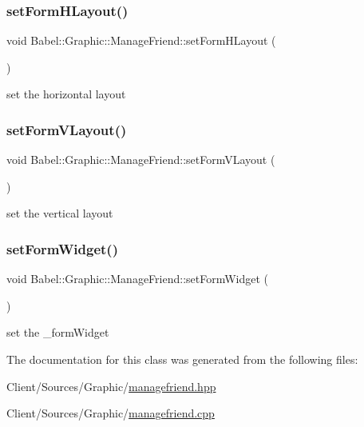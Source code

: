 \subsubsection{\texorpdfstring{set\+Form\+H\+Layout()}{setFormHLayout()}}
{\footnotesize\ttfamily void Babel\+::\+Graphic\+::\+Manage\+Friend\+::set\+Form\+H\+Layout (\begin{DoxyParamCaption}{ }\end{DoxyParamCaption})}

set the horizontal layout \mbox{\label{classBabel_1_1Graphic_1_1ManageFriend_ae86b93a24b1734171293e179a8e10669}} 
\subsubsection{\texorpdfstring{set\+Form\+V\+Layout()}{setFormVLayout()}}
{\footnotesize\ttfamily void Babel\+::\+Graphic\+::\+Manage\+Friend\+::set\+Form\+V\+Layout (\begin{DoxyParamCaption}{ }\end{DoxyParamCaption})}

set the vertical layout \mbox{\label{classBabel_1_1Graphic_1_1ManageFriend_a45d5e02d704042395e8de3c78103ea28}} 
\subsubsection{\texorpdfstring{set\+Form\+Widget()}{setFormWidget()}}
{\footnotesize\ttfamily void Babel\+::\+Graphic\+::\+Manage\+Friend\+::set\+Form\+Widget (\begin{DoxyParamCaption}{ }\end{DoxyParamCaption})}

set the \+\_\+form\+Widget 

The documentation for this class was generated from the following files\+:\begin{DoxyCompactItemize}
\item 
Client/\+Sources/\+Graphic/\hyperlink{managefriend_8hpp}{managefriend.\+hpp}\item 
Client/\+Sources/\+Graphic/\hyperlink{managefriend_8cpp}{managefriend.\+cpp}\end{DoxyCompactItemize}

